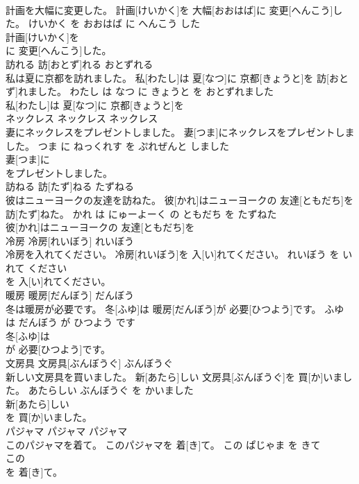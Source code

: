 \documentclass[8pt]{extreport}
\begin{document}
\begin{CJK}{UTF8}{min}
\\	計画を大幅に変更した。	計画[けいかく]を 大幅[おおはば]に 変更[へんこう]した。	けいかく を おおはば に へんこう した	
\\	計画[けいかく]を
\\	に 変更[へんこう]した。			
\\	訪れる	訪[おとず]れる	おとずれる	
\\	私は夏に京都を訪れました。	私[わたし]は 夏[なつ]に 京都[きょうと]を 訪[おとず]れました。	わたし は なつ に きょうと を おとずれました	
\\	私[わたし]は 夏[なつ]に 京都[きょうと]を
\\	ネックレス	ネックレス	ネックレス	
\\	妻にネックレスをプレゼントしました。	妻[つま]にネックレスをプレゼントしました。	つま に ねっくれす を ぷれぜんと しました	
\\	妻[つま]に
\\	をプレゼントしました。			
\\	訪ねる	訪[たず]ねる	たずねる	
\\	彼はニューヨークの友達を訪ねた。	彼[かれ]はニューヨークの 友達[ともだち]を 訪[たず]ねた。	かれ は にゅーよーく の ともだち を たずねた	
\\	彼[かれ]はニューヨークの 友達[ともだち]を
\\	冷房	冷房[れいぼう]	れいぼう	
\\	冷房を入れてください。	冷房[れいぼう]を 入[い]れてください。	れいぼう を いれて ください	
\\	を 入[い]れてください。			
\\	暖房	暖房[だんぼう]	だんぼう	
\\	冬は暖房が必要です。	冬[ふゆ]は 暖房[だんぼう]が 必要[ひつよう]です。	ふゆ は だんぼう が ひつよう です	
\\	冬[ふゆ]は
\\	が 必要[ひつよう]です。			
\\	文房具	文房具[ぶんぼうぐ]	ぶんぼうぐ	
\\	新しい文房具を買いました。	新[あたら]しい 文房具[ぶんぼうぐ]を 買[か]いました。	あたらしい ぶんぼうぐ を かいました	
\\	新[あたら]しい
\\	を 買[か]いました。			
\\	パジャマ	パジャマ	パジャマ	
\\	このパジャマを着て。	このパジャマを 着[き]て。	この ぱじゃま を きて	
\\	この
\\	を 着[き]て。			

\end{CJK}
\end{document}
